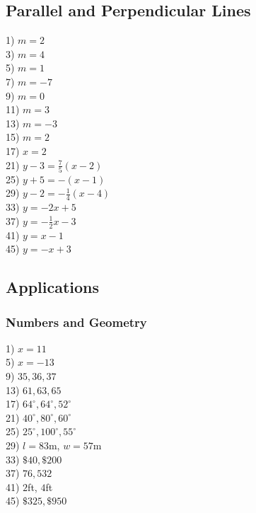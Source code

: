 \documentclass[11pt]{book}
\begin{document}
\newpage

\subsection*{Parallel and Perpendicular Lines}

\begin{multicols}{2}
1) $m=2$\\
3) $m=4$\\
5) $m=1$\\
7) $m=-7$\\
9) $m=0$\\
11) $m=3$\\
13) $m=-3$\\
15) $m=2$\\
17) $x=2$\\
21) $y-3=\frac{7}{5}(x-2)$\\
25) $y+5=-(x-1)$\\
29) $y-2=-\frac{1}{4}(x-4)$\\
33) $y=-2x+5$\\
37) $y=-\frac{1}{2}x-3$\\
41) $y=x-1$\\
45) $y=-x+3$
\end{multicols}

\subsection*{Applications}

\subsubsection{Numbers and Geometry}

\begin{multicols}{2}
1) $x=11$\\
5) $x=-13$\\
9) $35, 36, 37$\\
13) $61, 63, 65$\\
17) $64^{\circ}, 64^{\circ}, 52^{\circ}$\\
21) $40^{\circ}, 80^{\circ}, 60^{\circ}$\\
25) $25^{\circ}, 100^{\circ}, 55^{\circ}$\\
29) $l=83$m, $w=57$m\\
33) $\$40, \$200$\\
37) $76, 532$\\
41) $2$ft, $4$ft\\
45) $\$325, \$950$
\end{multicols}
\end{document}
